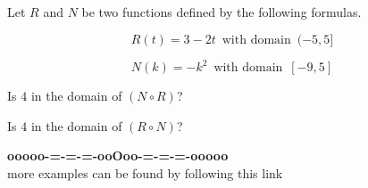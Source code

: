 \documentclass{ximera}
\begin{document}
\begin{question}




Let $R$ and $N$ be two functions defined by the following formulas.

\[
R(t) = 3 - 2t \,  \text{ with domain }  \,  (-5, 5]
\]


\[
N(k) = -k^2 \,  \text{ with domain }  \,  [-9, 5]
\]


Is $4$ in the domain of $(N \circ R)$?

\begin{multipleChoice}
\end{multipleChoice}







Is $4$ in the domain of $(R \circ N)$?

\begin{multipleChoice}
\end{multipleChoice}



\end{question}








\begin{onlineOnly}
\begin{center}
\textbf{\textcolor{green!50!black}{ooooo-=-=-=-ooOoo-=-=-=-ooooo}} \\

more examples can be found by following this link\\ 

\end{center}
\end{onlineOnly}
\end{document}
